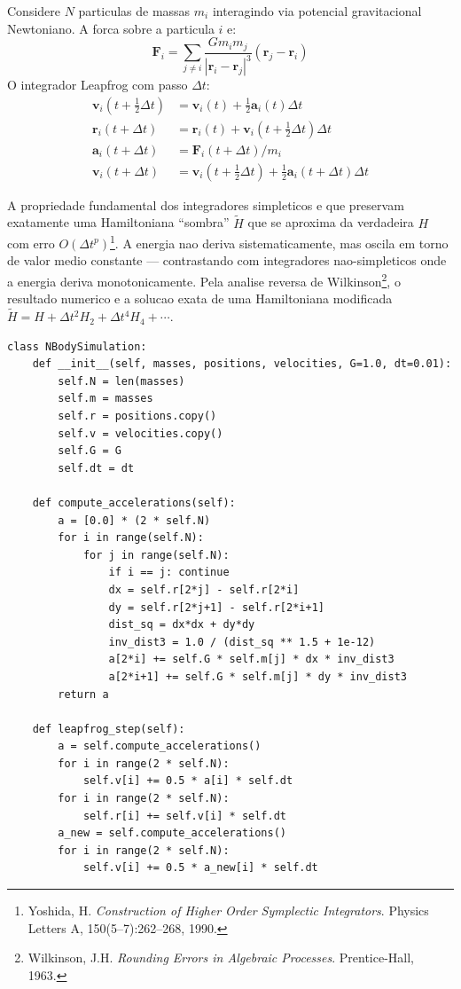 Considere $N$ particulas de massas $m_i$ interagindo via potencial
gravitacional Newtoniano. A forca sobre a particula $i$ e:
\[
\mathbf{F}_i = \sum_{j \neq i} \frac{G m_i m_j}
{|\mathbf{r}_i - \mathbf{r}_j|^3}(\mathbf{r}_j - \mathbf{r}_i)
\]
O integrador Leapfrog com passo $\Delta t$:
\begin{align*}
\mathbf{v}_i(t + \tfrac{1}{2}\Delta t) &=
\mathbf{v}_i(t) + \tfrac{1}{2} \mathbf{a}_i(t) \Delta t \\
\mathbf{r}_i(t + \Delta t) &=
\mathbf{r}_i(t) + \mathbf{v}_i(t + \tfrac{1}{2}\Delta t) \Delta t \\
\mathbf{a}_i(t + \Delta t) &= \mathbf{F}_i(t + \Delta t) / m_i \\
\mathbf{v}_i(t + \Delta t) &=
\mathbf{v}_i(t + \tfrac{1}{2}\Delta t) + \tfrac{1}{2}
\mathbf{a}_i(t + \Delta t) \Delta t
\end{align*}

A propriedade fundamental dos integradores simpleticos e que preservam
exatamente uma Hamiltoniana ``sombra'' $\tilde{H}$ que se aproxima da
verdadeira $H$ com erro $O(\Delta t^p)$\footnote{Yoshida, H.
\textit{Construction of Higher Order Symplectic Integrators}. Physics
Letters A, 150(5--7):262--268, 1990.}. A energia nao deriva
sistematicamente, mas oscila em torno de valor medio constante ---
contrastando com integradores nao-simpleticos onde a energia deriva
monotonicamente. Pela analise reversa de Wilkinson\footnote{Wilkinson,
J.H. \textit{Rounding Errors in Algebraic Processes}. Prentice-Hall,
1963.}, o resultado numerico e a solucao exata de uma Hamiltoniana
modificada $\tilde{H} = H + \Delta t^2 H_2 + \Delta t^4 H_4 + \cdots$.

\begin{verbatim}
class NBodySimulation:
    def __init__(self, masses, positions, velocities, G=1.0, dt=0.01):
        self.N = len(masses)
        self.m = masses
        self.r = positions.copy()
        self.v = velocities.copy()
        self.G = G
        self.dt = dt

    def compute_accelerations(self):
        a = [0.0] * (2 * self.N)
        for i in range(self.N):
            for j in range(self.N):
                if i == j: continue
                dx = self.r[2*j] - self.r[2*i]
                dy = self.r[2*j+1] - self.r[2*i+1]
                dist_sq = dx*dx + dy*dy
                inv_dist3 = 1.0 / (dist_sq ** 1.5 + 1e-12)
                a[2*i] += self.G * self.m[j] * dx * inv_dist3
                a[2*i+1] += self.G * self.m[j] * dy * inv_dist3
        return a

    def leapfrog_step(self):
        a = self.compute_accelerations()
        for i in range(2 * self.N):
            self.v[i] += 0.5 * a[i] * self.dt
        for i in range(2 * self.N):
            self.r[i] += self.v[i] * self.dt
        a_new = self.compute_accelerations()
        for i in range(2 * self.N):
            self.v[i] += 0.5 * a_new[i] * self.dt
\end{verbatim}

